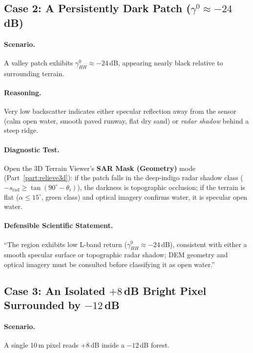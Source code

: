 \documentclass[11pt,a4paper]{article}
\begin{document}
\subsection{Case 2: A Persistently Dark Patch (\texorpdfstring{$\gamma^0 \approx -24$}{gamma0 approx -24}\,dB)}

\paragraph{Scenario.} A valley patch exhibits $\gamma^0_{HH}\approx-24$\,dB, appearing nearly black relative to surrounding terrain.

\paragraph{Reasoning.} Very low backscatter indicates either specular reflection away from the sensor (calm open water, smooth paved runway, flat dry sand) or \emph{radar shadow} behind a steep ridge.

\paragraph{Diagnostic Test.} Open the 3D Terrain Viewer's \textbf{SAR Mask (Geometry)} mode (Part~\ref{part:relieve3d}): if the patch falls in the deep-indigo radar shadow class ($-s_{\mathrm{rad}} \ge \tan(90^\circ-\theta_i)$), the darkness is topographic occlusion; if the terrain is flat ($\alpha \le 15^\circ$, green class) and optical imagery confirms water, it is specular open water.

\paragraph{Defensible Scientific Statement.} ``The region exhibits low L-band return ($\gamma^0_{HH}\approx-24$\,dB), consistent with either a smooth specular surface or topographic radar shadow; DEM geometry and optical imagery must be consulted before classifying it as open water.''

\subsection{Case 3: An Isolated $+8$\,dB Bright Pixel Surrounded by $-12$\,dB}

\paragraph{Scenario.} A single 10\,m pixel reads $+8$\,dB inside a $-12$\,dB forest.
\end{document}
